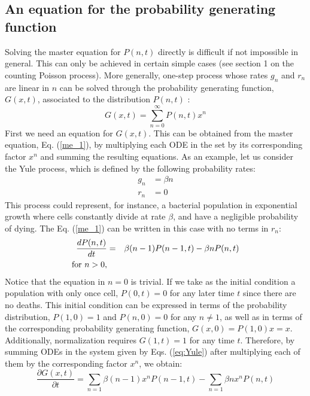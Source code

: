 \subsection{An equation for the probability generating function}
Solving the master equation for $P(n,t)$ directly is difficult if not impossible in general. This can only be achieved in certain simple cases (see section 1 on the counting Poisson process). More generally, one-step process 
whose rates $g_n$ and $r_n$ are linear in $n$ can be solved through the probability generating function, $G(x,t)$, associated to the distribution $P(n,t)$ \cite{Barlett60}:
\begin{equation}
G(x,t) = \sum_{n=0}^{\infty} P(n,t) x^n
\end{equation}
First we need an equation for $G(x,t)$. This can be obtained from the master equation, Eq. (\ref{me_1}), by multiplying each ODE in the set by its corresponding factor $x^n$ and summing the resulting equations. As an example, let us consider the Yule process, which is defined by the following probability rates:
\begin{align*}
	g_n & = \beta n\\
    r_n & = 0
\end{align*}
This process could represent, for instance, a bacterial population in exponential growth where cells constantly divide at rate $\beta$, and have a negligible probability of dying. The Eq. (\ref{me_1}) can be written in this case with no terms in $r_n$:    
\begin{eqnarray}
\frac{dP(n,t)}{dt}            & = & \beta (n-1) P(n-1,t) - \beta n P(n,t)         \nonumber \\
\textup{for} \,\, n > 0,      &   &                                               \label{eq:Yule}
\end{eqnarray}
Notice that the equation in $n=0$ is trivial. If we take as the initial condition a population with only once cell, $P(0,t) = 0$ for any later time $t$ since there are no deaths. This initial condition can be expressed in terms of the probability distribution, $P(1,0)=1$ and $P(n,0)=0$ for any $n \not = 1$, as well as in terms of the corresponding probability generating function, $G(x,0) = P(1,0) x = x$. Additionally, normalization requires $G(1,t) = 1$ for any time $t$. Therefore, by summing ODEs in the system given by Eqs. (\ref{eq:Yule}) after multiplying each of them by the corresponding factor $x^n$, we obtain:
\begin{equation}
\frac{\partial G(x,t)}{\partial t} = \sum_{n=1} \beta (n-1) x^n P(n-1,t) - \sum_{n=1} \beta n x^n P(n,t)
\end{equation}
